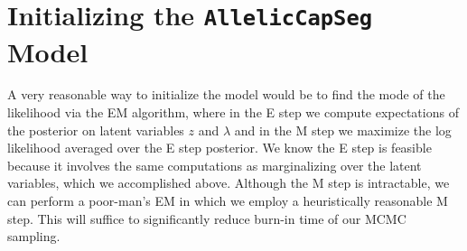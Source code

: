 \documentclass[nofootinbib,amssymb,amsmath]{revtex4}
\newcommand{\ACS}{\texttt{AllelicCapSeg}}
\begin{document}
\section{Initializing the \ACS ~ Model} \label{initializing}
A very reasonable way to initialize the model would be to find the mode of the likelihood via the EM algorithm, where in the E step we compute expectations of the posterior on latent variables $z$ and $\lambda$ and in the M step we maximize the log likelihood averaged over the E step posterior.  We know the E step is feasible because it involves the same computations as marginalizing over the latent variables, which we accomplished above.  Although the M step is intractable, we can perform a poor-man's EM in which we employ a heuristically reasonable M step.  This will suffice to significantly reduce burn-in time of our MCMC sampling.
\end{document}
